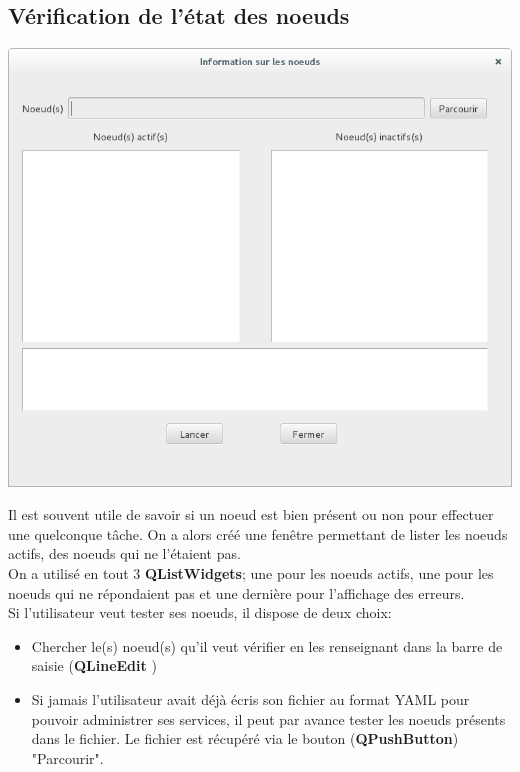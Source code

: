 \documentclass[a4paper,11pt]{article}
\begin{document}
\subsection{Vérification de l'état des noeuds}

\begin{center}
\includegraphics[scale=0.6]{fen_etat_noeud.png} 
\end{center}
\noindent
Il est souvent utile de savoir si un noeud est bien présent ou non pour effectuer une quelconque tâche. On a alors créé une fenêtre permettant de lister les noeuds actifs, des noeuds qui ne l'étaient pas.\\
On a utilisé en tout 3 \textbf{QListWidgets}; une pour les noeuds actifs, une pour les noeuds qui ne répondaient pas et une dernière pour l'affichage des erreurs.\\
Si l'utilisateur veut tester ses noeuds, il dispose de deux choix:
\begin{itemize}
 \item Chercher le(s) noeud(s) qu'il veut vérifier en les renseignant dans la barre de saisie (\textbf{QLineEdit} )
 \item Si jamais l'utilisateur avait déjà écris son fichier au format YAML pour pouvoir administrer ses services, il peut par avance tester les noeuds présents dans le fichier. Le fichier est récupéré via le bouton (\textbf{QPushButton}) "Parcourir".
 \end{itemize}
\end{document}

